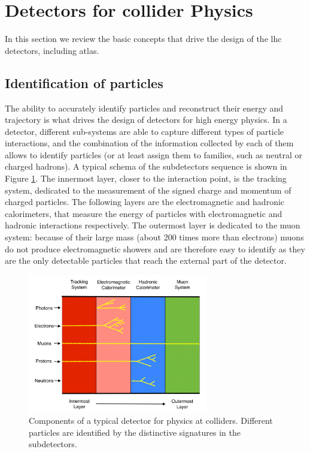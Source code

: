 \section{Detectors for collider Physics}
\label{sec:detectors}

In this section we review the basic concepts that drive the design of the \gls{lhc} detectors, including \gls{atlas}.

\subsection{Identification of particles}
\label{sec:detectors:identification}



The ability to accurately identify particles and reconstruct their energy and trajectory is what drives the design of detectors for high energy physics. In a detector, different sub-systems are able to capture different types of particle interactions, and the combination of the information collected by each of them allows to identify particles (or at least assign them to families, such as neutral or charged hadrons). A typical schema of the subdetectors sequence is shown in Figure \ref{fig:detector:interaction}. The innermost layer, closer to the interaction point, is the tracking system, dedicated to the measurement of the signed charge and momentum of charged particles. The following layers are the electromagnetic and hadronic calorimeters, that measure the energy of particles with electromagnetic and hadronic interactions respectively. The outermost layer is dedicated to the muon system: because of their large mass (about 200 times more than electrons) muons do not produce electromagnetic showers and are therefore easy to identify as they are the only detectable particles that reach the external part of the detector.

\begin{figure}[ht]
\centering
\includegraphics[width=0.7\textwidth]{figures/springer/detector}
\caption{Components of a typical detector for physics at colliders. Different particles are identified by the distinctive signatures in the subdetectors.}
\label{fig:detector:interaction}
\end{figure}


